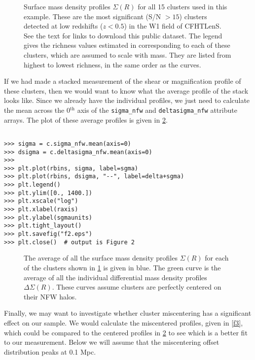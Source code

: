 \documentclass[twocolumn]{aastex6}
\newcommand{\code}{\lstinline[style=codeintext]}
\begin{document}
\begin{figure}
\caption{Surface mass density profiles $\Sigma(R)$ for all 15 clusters used in this example. These are the most significant (S/N $>15$) clusters detected at low redshifts ($z < 0.5$) in the W1 field of CFHTLenS. See the text for links to download this public dataset. The legend gives the richness values estimated in \citet{Ford15} corresponding to each of these clusters, which are assumed to scale with mass. They are listed from highest to lowest richness, in the same order as the curves.}
\label{f1}
\end{figure}

If we had made a stacked measurement of the shear or magnification profile of these clusters, then we would want to know what the average profile of the stack looks like. Since we already have the individual profiles, we just need to calculate the mean across the 0$^\mathrm{th}$ axis of the \code{sigma_nfw} and \code{deltasigma_nfw} attribute arrays. The plot of these average profiles is given in \cref{f2}.

\begin{verbatim}

>>> sigma = c.sigma_nfw.mean(axis=0)
>>> dsigma = c.deltasigma_nfw.mean(axis=0)
>>> 
>>> plt.plot(rbins, sigma, label=sgma)
>>> plt.plot(rbins, dsigma, "--", label=delta+sgma)
>>> plt.legend()
>>> plt.ylim([0., 1400.])
>>> plt.xscale("log")
>>> plt.xlabel(raxis)
>>> plt.ylabel(sgmaunits)
>>> plt.tight_layout()
>>> plt.savefig("f2.eps")
>>> plt.close()  # output is Figure 2

\end{verbatim}

\begin{figure}
\caption{The average of all the surface mass density profiles $\Sigma(R)$ for each of the clusters shown in \cref{f1} is given in blue. The green curve is the average of all the individual differential mass density profiles $\Delta\Sigma(R)$. These curves assume clusters are perfectly centered on their NFW halos.}
\label{f2}
\end{figure}

Finally, we may want to investigate whether cluster miscentering has a significant effect on our sample. We would calculate the miscentered profiles, given in \cref{f3}, which could be compared to the centered profiles in \cref{f2} to see which is a better fit to our measurement. Below we will assume that the miscentering offset distribution peaks at 0.1 Mpc.
\end{document}
